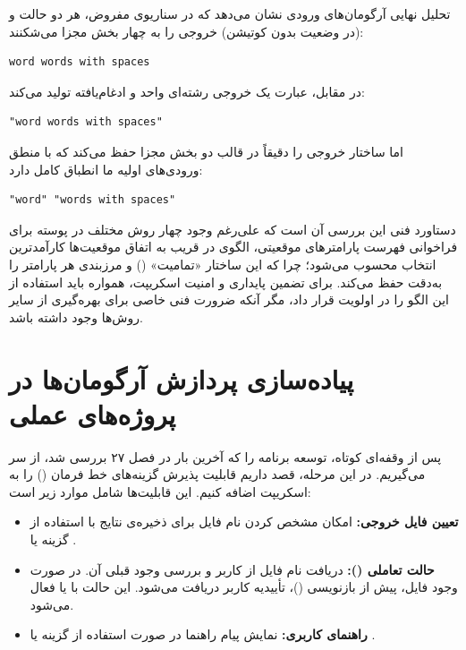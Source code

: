 تحلیل نهایی آرگومان‌های ورودی نشان می‌دهد که در سناریوی مفروض، هر دو حالت \cmd{\$\*} و \cmd{\$\@} (در وضعیت بدون کوتیشن) خروجی را به چهار بخش مجزا می‌شکنند:

\begin{latin}
\begin{lstlisting}
word words with spaces
\end{lstlisting}
\end{latin}

در مقابل، عبارت  یک خروجی رشته‌ای واحد و ادغام‌یافته تولید می‌کند:

\begin{latin}
\begin{lstlisting}
"word words with spaces"
\end{lstlisting}
\end{latin}

اما ساختار  خروجی را دقیقاً در قالب دو بخش مجزا حفظ می‌کند که با منطق ورودی‌های اولیه ما انطباق کامل دارد:

\begin{latin}
\begin{lstlisting}
"word" "words with spaces"
\end{lstlisting}
\end{latin}

دستاورد فنی این بررسی آن است که علی‌رغم وجود چهار روش مختلف در پوسته برای فراخوانی فهرست پارامترهای موقعیتی، الگوی  در قریب به اتفاق موقعیت‌ها کارآمدترین انتخاب محسوب می‌شود؛ چرا که این ساختار «تمامیت» () و مرزبندی هر پارامتر را به‌دقت حفظ می‌کند. برای تضمین پایداری و امنیت اسکریپت، همواره باید استفاده از این الگو را در اولویت قرار داد، مگر آنکه ضرورت فنی خاصی برای بهره‌گیری از سایر روش‌ها وجود داشته باشد.

\section{پیاده‌سازی پردازش آرگومان‌ها در پروژه‌های عملی}

پس از وقفه‌ای کوتاه، توسعه برنامه  را که آخرین بار در فصل ۲۷ بررسی شد، از سر می‌گیریم. در این مرحله، قصد داریم قابلیت پذیرش گزینه‌های خط فرمان () را به اسکریپت اضافه کنیم. این قابلیت‌ها شامل موارد زیر است:

\begin{itemize}
  \item \textbf{تعیین فایل خروجی:} امکان مشخص کردن نام فایل برای ذخیره‌ی نتایج با استفاده از گزینه  یا .
  \item \textbf{حالت تعاملی ():} دریافت نام فایل از کاربر و بررسی وجود قبلی آن. در صورت وجود فایل، پیش از بازنویسی ()، تأییدیه کاربر دریافت می‌شود. این حالت با  یا  فعال می‌شود.
  \item \textbf{راهنمای کاربری:} نمایش پیام راهنما در صورت استفاده از گزینه  یا .
\end{itemize}

